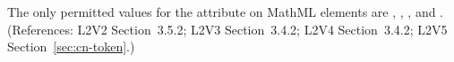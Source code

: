 The only permitted values for the  attribute on MathML
 elements are , , , and
.  (References: L2V2 Section~3.5.2; L2V3 Section~3.4.2; L2V4 Section~3.4.2;
L2V5 Section~\ref{sec:cn-token}.)
